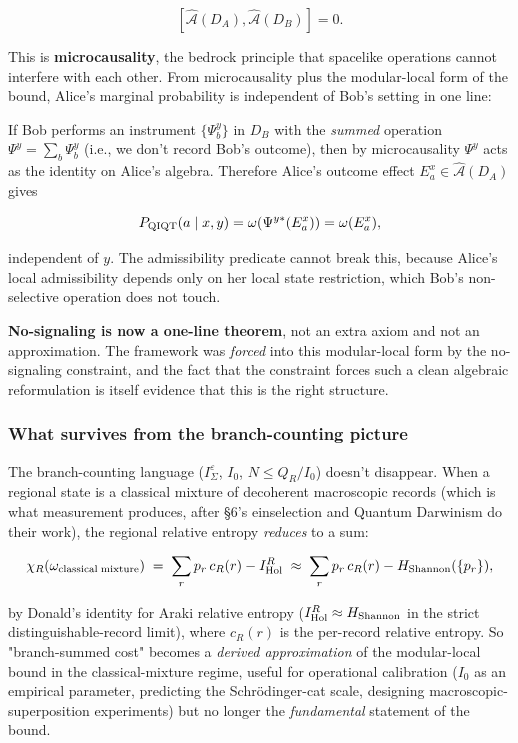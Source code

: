 \documentclass[11pt,a4paper]{article}
\begin{document}
\[
[\hat{\mathcal{A}}(D_A), \hat{\mathcal{A}}(D_B)] = 0.
\]

This is \textbf{microcausality}, the bedrock principle that spacelike operations cannot interfere with each other. From microcausality plus the modular-local form of the bound, Alice's marginal probability is independent of Bob's setting in one line:

If Bob performs an instrument $\{\Psi_b^y\}$ in $D_B$ with the \emph{summed} operation $\Psi^y = \sum_b \Psi_b^y$ (i.e., we don't record Bob's outcome), then by microcausality $\Psi^y$ acts as the identity on Alice's algebra. Therefore Alice's outcome effect $E_a^x \in \hat{\mathcal{A}}(D_A)$ gives

\[
P_{\rm QIQT}(a \mid x, y) = \omega(\Psi^{y*}(E_a^x)) = \omega(E_a^x),
\]

independent of $y$. The admissibility predicate cannot break this, because Alice's local admissibility depends only on her local state restriction, which Bob's non-selective operation does not touch.

\textbf{No-signaling is now a one-line theorem}, not an extra axiom and not an approximation. The framework was \emph{forced} into this modular-local form by the no-signaling constraint, and the fact that the constraint forces such a clean algebraic reformulation is itself evidence that this is the right structure.

\subsubsection{What survives from the branch-counting picture}

The branch-counting language ($I_\Sigma^\varepsilon$, $I_0$, $N \le Q_R/I_0$) doesn't disappear. When a regional state is a classical mixture of decoherent macroscopic records (which is what measurement produces, after §6's einselection and Quantum Darwinism do their work), the regional relative entropy \emph{reduces} to a sum:

\[
\chi_R(\omega_{\rm classical\;mixture}) \;=\; \sum_r p_r\, c_R(r) - I_{\rm Hol}^R \;\approx\; \sum_r p_r\, c_R(r) - H_{\rm Shannon}(\{p_r\}),
\]

by Donald's identity for Araki relative entropy ($I_{\rm Hol}^R \approx H_{\rm Shannon}$ in the strict distinguishable-record limit), where $c_R(r)$ is the per-record relative entropy. So "branch-summed cost" becomes a \emph{derived approximation} of the modular-local bound in the classical-mixture regime, useful for operational calibration ($I_0$ as an empirical parameter, predicting the Schrödinger-cat scale, designing macroscopic-superposition experiments) but no longer the \emph{fundamental} statement of the bound.
\end{document}
